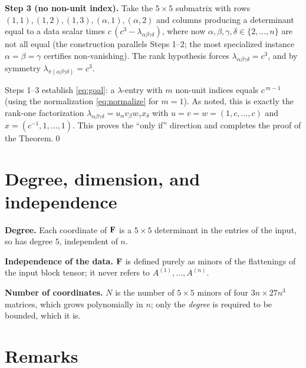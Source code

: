 \documentclass[11pt]{article}
\begin{document}
\medskip
\noindent\textbf{Step 3 (no non-unit index).}
Take the $5\times5$ submatrix with rows $(1,1),(1,2),(1,3),(\alpha,1),(\alpha,2)$
and columns producing a determinant equal to a data scalar times
$c\,(c^{3}-\lambda_{\alpha\beta\gamma\delta})$, where now
$\alpha,\beta,\gamma,\delta\in\{2,\dots,n\}$ are not all equal (the construction
parallels Steps 1–2; the most specialized instance $\alpha=\beta=\gamma$ certifies
non-vanishing). The rank hypothesis forces $\lambda_{\alpha\beta\gamma\delta}=c^{3}$,
and by symmetry $\lambda_{\pi(\alpha\beta\gamma\delta)}=c^{3}$.

\medskip
Steps 1–3 establish \eqref{eq:goal}: a $\lambda$-entry with $m$ non-unit indices
equals $c^{\,m-1}$ (using the normalization \eqref{eq:normalize} for $m=1$). As
noted, this is exactly the rank-one factorization
$\lambda_{\alpha\beta\gamma\delta}=u_\alpha v_\beta w_\gamma x_\delta$ with
$u=v=w=(1,c,\dots,c)$ and $x=(c^{-1},1,\dots,1)$. This proves the ``only if''
direction and completes the proof of the Theorem.\qed

\section*{Degree, dimension, and independence}

\textbf{Degree.} Each coordinate of $\mathbf{F}$ is a $5\times5$ determinant in the
entries of the input, so has degree $5$, independent of $n$. \checkmark

\textbf{Independence of the data.} $\mathbf{F}$ is defined purely as minors of the
flattenings of the input block tensor; it never refers to $A^{(1)},\dots,A^{(n)}$. \checkmark

\textbf{Number of coordinates.} $N$ is the number of $5\times5$ minors of four
$3n\times27n^{3}$ matrices, which grows polynomially in $n$; only the
\emph{degree} is required to be bounded, which it is. \checkmark

\section*{Remarks}
\end{document}
